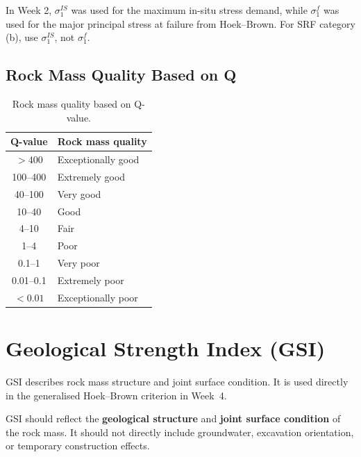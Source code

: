 \documentclass[a4paper,12pt]{article}
\begin{document}
\begin{notebox}
In Week 2, \(\sigma_1^{IS}\) was used for the maximum in-situ stress demand, while
\(\sigma_1^f\) was used for the major principal stress at failure from Hoek--Brown.
For SRF category (b), use \(\sigma_1^{IS}\), not \(\sigma_1^f\).
\end{notebox}

\subsection{Rock Mass Quality Based on Q}

\begin{table}[H]
\centering
\small
\begin{tabular}{c l}
\toprule
\textbf{Q-value} & \textbf{Rock mass quality} \\
\midrule
\(>400\) & Exceptionally good \\
100--400 & Extremely good \\
40--100 & Very good \\
10--40 & Good \\
4--10 & Fair \\
1--4 & Poor \\
0.1--1 & Very poor \\
0.01--0.1 & Extremely poor \\
\(<0.01\) & Exceptionally poor \\
\bottomrule
\end{tabular}
\caption{Rock mass quality based on Q-value.}
\label{tab:q_quality}
\end{table}

\section{Geological Strength Index (GSI)}

GSI describes rock mass structure and joint surface condition. It is used directly in
the generalised Hoek--Brown criterion in Week~4.

\begin{keybox}
GSI should reflect the \textbf{geological structure} and \textbf{joint surface condition} of
the rock mass. It should not directly include groundwater, excavation orientation, or
temporary construction effects.
\end{keybox}
\end{document}
